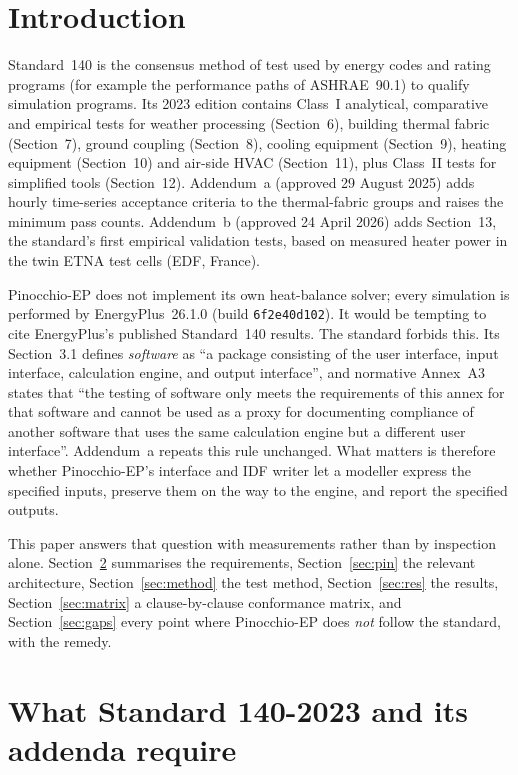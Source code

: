 \documentclass[10pt,a4paper]{article}
\newcommand{\code}[1]{\texttt{\small #1}}
\begin{document}
\section{Introduction}
Standard~140 is the consensus method of test used by energy codes and rating programs (for example the performance paths of ASHRAE~90.1) to qualify simulation
programs. Its 2023 edition contains Class~I analytical, comparative and empirical tests for weather processing
(Section~6), building thermal fabric (Section~7), ground coupling (Section~8), cooling equipment (Section~9),
heating equipment (Section~10) and air-side HVAC (Section~11), plus Class~II tests for simplified tools
(Section~12). Addendum~a (approved 29 August 2025) adds hourly time-series acceptance criteria to the
thermal-fabric groups and raises the minimum pass counts. Addendum~b (approved 24 April 2026) adds Section~13, the
standard's first empirical validation tests, based on measured heater power in the twin ETNA test cells
(EDF, France).

Pinocchio-EP does not implement its own heat-balance solver; every simulation is performed by EnergyPlus~26.1.0
(build \code{6f2e40d102}). It would be tempting to cite EnergyPlus's published Standard~140 results. The standard
forbids this. Its Section~3.1 defines \emph{software} as ``a package consisting of the user interface, input
interface, calculation engine, and output interface'', and normative Annex~A3 states that ``the testing of software
only meets the requirements of this annex for that software and cannot be used as a proxy for documenting compliance
of another software that uses the same calculation engine but a different user interface''. Addendum~a repeats
this rule unchanged. What matters is therefore whether Pinocchio-EP's interface and IDF writer let a modeller
express the specified inputs, preserve them on the way to the engine, and report the specified outputs.

This paper answers that question with measurements rather than by inspection alone. Section~\ref{sec:std}
summarises the requirements, Section~\ref{sec:pin} the relevant architecture, Section~\ref{sec:method} the test
method, Section~\ref{sec:res} the results, Section~\ref{sec:matrix} a clause-by-clause conformance matrix, and
Section~\ref{sec:gaps} every point where Pinocchio-EP does \emph{not} follow the standard, with the remedy.

\section{What Standard 140-2023 and its addenda require}\label{sec:std}
\end{document}
